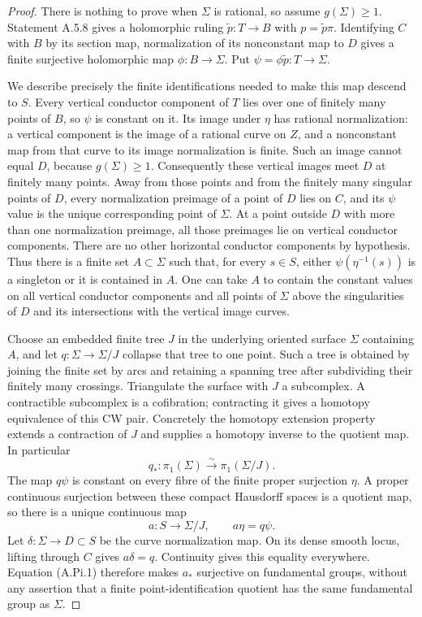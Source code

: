 \begin{proof}
There is nothing to prove when $\Sigma$ is rational, so
assume $g(\Sigma)\ge1$.
Statement A.5.8 gives a holomorphic ruling
$\widetilde p:T\to B$ with $p=\widetilde p\pi$.
Identifying $C$ with $B$ by its section map, normalization
of its nonconstant map to $D$ gives a finite surjective
holomorphic map $\phi:B\to\Sigma$.
Put $\psi=\phi\widetilde p:T\to\Sigma$.

We describe precisely the finite identifications needed to
make this map descend to $S$. Every vertical conductor
component of $T$ lies over one of finitely many points of
$B$, so $\psi$ is constant on it. Its image under $\eta$
has rational normalization: a vertical component is the
image of a rational curve on $Z$, and a nonconstant map
from that curve to its image normalization is finite.
Such an image cannot equal $D$, because $g(\Sigma)\ge1$.
Consequently these vertical images meet $D$ at finitely
many points. Away from those points and from the finitely
many singular points of $D$, every normalization preimage
of a point of $D$ lies on $C$, and its $\psi$ value is the
unique corresponding point of $\Sigma$.
At a point outside $D$ with more than one normalization
preimage, all those preimages lie on vertical conductor
components. There are no other horizontal conductor
components by hypothesis. Thus there is a finite set
$A\subset\Sigma$ such that, for every $s\in S$, either
$\psi(\eta^{-1}(s))$ is a singleton or it is contained
in $A$. One can take $A$ to contain the constant values
on all vertical conductor components and all points of
$\Sigma$ above the singularities of $D$ and its
intersections with the vertical image curves.

Choose an embedded finite tree $J$ in the underlying
oriented surface $\Sigma$ containing $A$, and let
$q:\Sigma\to\Sigma/J$ collapse that tree to one point.
Such a tree is obtained by joining the finite set by
arcs and retaining a spanning tree after subdividing
their finitely many crossings. Triangulate the surface
with $J$ a subcomplex. A contractible subcomplex is a
cofibration; contracting it gives a homotopy equivalence
of this CW pair. Concretely the homotopy extension
property extends a contraction of $J$ and supplies a
homotopy inverse to the quotient map. In particular
\[
              q_*:\pi_1(\Sigma)\xrightarrow{\sim}
                         \pi_1(\Sigma/J).          \tag{A.Pi.1}
\]
The map $q\psi$ is constant on every fibre of the finite
proper surjection $\eta$. A proper continuous surjection
between these compact Hausdorff spaces is a quotient
map, so there is a unique continuous map
\[
 a:S\longrightarrow\Sigma/J,
 \qquad a\eta=q\psi.                              \tag{A.Pi.2}
\]
Let $\delta:\Sigma\to D\subset S$ be the curve normalization
map. On its dense smooth locus, lifting through $C$ gives
$a\delta=q$. Continuity gives this equality everywhere.
Equation (A.Pi.1) therefore makes $a_*$ surjective on
fundamental groups, without any assertion that a finite
point-identification quotient has the same fundamental
group as $\Sigma$.


\end{proof}
